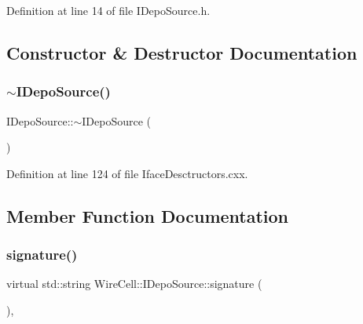 Definition at line 14 of file I\+Depo\+Source.\+h.



\subsection{Constructor \& Destructor Documentation}
\mbox{\label{class_wire_cell_1_1_i_depo_source_a842399da5e2203eba2056a722e66bb52}} 
\subsubsection{\texorpdfstring{$\sim$\+I\+Depo\+Source()}{~IDepoSource()}}
{\footnotesize\ttfamily I\+Depo\+Source\+::$\sim$\+I\+Depo\+Source (\begin{DoxyParamCaption}{ }\end{DoxyParamCaption})\hspace{0.3cm}{\ttfamily [virtual]}}



Definition at line 124 of file Iface\+Desctructors.\+cxx.



\subsection{Member Function Documentation}
\mbox{\label{class_wire_cell_1_1_i_depo_source_a2d49f81dff56ffe7fefed50219395c3b}} 
\subsubsection{\texorpdfstring{signature()}{signature()}}
{\footnotesize\ttfamily virtual std\+::string Wire\+Cell\+::\+I\+Depo\+Source\+::signature (\begin{DoxyParamCaption}{ }\end{DoxyParamCaption})\hspace{0.3cm}{\ttfamily [inline]}, {\ttfamily [virtual]}}



